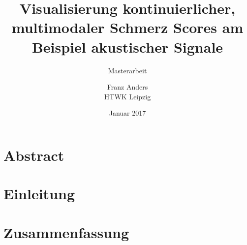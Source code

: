 \documentclass{scrreprt}
\title{Visualisierung kontinuierlicher, multimodaler Schmerz Scores am Beispiel akustischer Signale}
\subtitle{Masterarbeit}
\author{Franz Anders \\ HTWK Leipzig }
\date{Januar 2017}
\begin{document}
	


\maketitle


\chapter*{Abstract}

\tableofcontents
\listoffigures


\chapter{Einleitung}


%
%



\chapter{Zusammenfassung}





\end{document}
